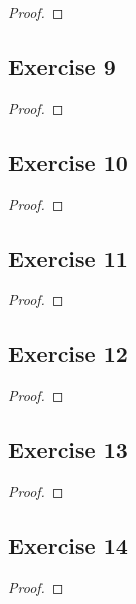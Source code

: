 \documentclass[14pt]{extarticle}
\begin{document}
\begin{proof}

\end{proof}

\subsection{Exercise 9}

\begin{proof}

\end{proof}

\subsection{Exercise 10}

\begin{proof}

\end{proof}

\subsection{Exercise 11}

\begin{proof}

\end{proof}

\subsection{Exercise 12}

\begin{proof}

\end{proof}

\subsection{Exercise 13}

\begin{proof}

\end{proof}

\subsection{Exercise 14}

\begin{proof}

\end{proof}
\end{document}
